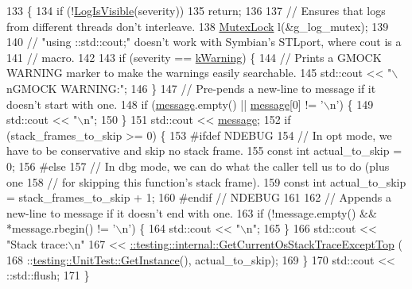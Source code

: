\begin{DoxyCode}
133                                               \{
134   \textcolor{keywordflow}{if} (!\hyperlink{namespacetesting_1_1internal_a69ffdba5ee36743e88d8f89b79e566ff}{LogIsVisible}(severity))
135     \textcolor{keywordflow}{return};
136 
137   \textcolor{comment}{// Ensures that logs from different threads don't interleave.}
138   \hyperlink{namespacetesting_1_1internal_a08b187c6cc4e28400aadf9a32fccc8de}{MutexLock} l(&g\_log\_mutex);
139 
140   \textcolor{comment}{// "using ::std::cout;" doesn't work with Symbian's STLport, where cout is a}
141   \textcolor{comment}{// macro.}
142 
143   \textcolor{keywordflow}{if} (severity == \hyperlink{namespacetesting_1_1internal_a203d1a8a2147a53d12bbdae40d443914a5beeeab1b0a3caabd0afb43356c1a271}{kWarning}) \{
144     \textcolor{comment}{// Prints a GMOCK WARNING marker to make the warnings easily searchable.}
145     std::cout << \textcolor{stringliteral}{"\(\backslash\)nGMOCK WARNING:"};
146   \}
147   \textcolor{comment}{// Pre-pends a new-line to message if it doesn't start with one.}
148   \textcolor{keywordflow}{if} (\hyperlink{namespacegtest__output__test_ac696d0798ad7d08cb2e61070824750e2}{message}.empty() || \hyperlink{namespacegtest__output__test_ac696d0798ad7d08cb2e61070824750e2}{message}[0] != \textcolor{charliteral}{'\(\backslash\)n'}) \{
149     std::cout << \textcolor{stringliteral}{"\(\backslash\)n"};
150   \}
151   std::cout << \hyperlink{namespacegtest__output__test_ac696d0798ad7d08cb2e61070824750e2}{message};
152   \textcolor{keywordflow}{if} (stack\_frames\_to\_skip >= 0) \{
153 \textcolor{preprocessor}{#ifdef NDEBUG}
154     \textcolor{comment}{// In opt mode, we have to be conservative and skip no stack frame.}
155     \textcolor{keyword}{const} \textcolor{keywordtype}{int} actual\_to\_skip = 0;
156 \textcolor{preprocessor}{#else}
157     \textcolor{comment}{// In dbg mode, we can do what the caller tell us to do (plus one}
158     \textcolor{comment}{// for skipping this function's stack frame).}
159     \textcolor{keyword}{const} \textcolor{keywordtype}{int} actual\_to\_skip = stack\_frames\_to\_skip + 1;
160 \textcolor{preprocessor}{#endif  // NDEBUG}
161 
162     \textcolor{comment}{// Appends a new-line to message if it doesn't end with one.}
163     \textcolor{keywordflow}{if} (!message.empty() && *message.rbegin() != \textcolor{charliteral}{'\(\backslash\)n'}) \{
164       std::cout << \textcolor{stringliteral}{"\(\backslash\)n"};
165     \}
166     std::cout << \textcolor{stringliteral}{"Stack trace:\(\backslash\)n"}
167          << \hyperlink{namespacetesting_1_1internal_aeb475922b8cd1e6c60ac052bbc396e62}{::testing::internal::GetCurrentOsStackTraceExceptTop}
      (
168              ::\hyperlink{classtesting_1_1UnitTest_a24192400b70b3b946746954e9574fb8e}{testing::UnitTest::GetInstance}(), actual\_to\_skip);
169   \}
170   std::cout << ::std::flush;
171 \}
\end{DoxyCode}
